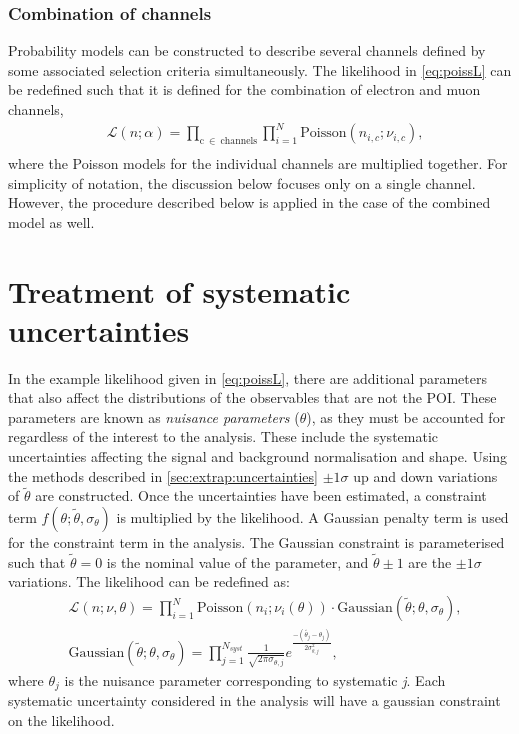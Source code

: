 \subsubsection{Combination of channels}
Probability models can be constructed to describe several channels defined by some associated selection criteria simultaneously. The likelihood in \cref{eq:poissL} can be redefined such that it is defined for the combination of electron and muon channels,
\begin{equation}
    \label{eq:poissLcomb}
    \begin{aligned}
        & \mathcal{L}(n;\alpha) = \prod_{\mathrm{c}~\in~\mathrm{channels}}\prod_{i=1}^{N}\mathrm{Poisson}(n_{i,c};\nu_{i,c}), \\
    \end{aligned}
\end{equation}
where the Poisson models for the individual channels are multiplied together. For simplicity of notation, the discussion below focuses only on a single channel. However, the procedure described below is applied in the case of the combined model as well. 

\section{Treatment of systematic uncertainties}\label{sec:stats:nps}
In the example likelihood given in \cref{eq:poissL}, there are additional parameters that also affect the distributions of the observables that are not the POI. These parameters are known as \emph{nuisance parameters} ($\theta$), as they must be accounted for regardless of the interest to the analysis. These include the systematic uncertainties affecting the signal and background normalisation and shape. Using the methods described in \cref{sec:extrap:uncertainties} $\pm 1\sigma$ up and down variations of $\tilde{\theta}$ are constructed. Once the uncertainties have been estimated, a constraint term $f(\theta;\tilde{\theta},\sigma_\theta)$ is multiplied by the likelihood. A Gaussian penalty term is used for the constraint term in the analysis. The Gaussian constraint is parameterised such that $\tilde{\theta} = 0$ is the nominal value of the parameter, and $\tilde{\theta} \pm 1$ are the $\pm1\sigma$ variations. The likelihood can be redefined as:
\begin{equation}
    \label{eq:likelihood}
    \begin{aligned}
        & \mathcal{L}(n;\nu,\theta) = \prod_{i=1}^{N}\mathrm{Poisson}(n_i;\nu_i(\theta)) \cdot \mathrm{Gaussian}(\tilde{\theta};\theta,\sigma_\theta), \\
        & \mathrm{Gaussian}(\tilde{\theta};\theta,\sigma_\theta) = \prod_{j=1}^{N_{syst}} \frac{1}{\sqrt{2\pi\sigma_{\theta,j}}} e^\frac{-(\tilde{\theta_j} - \theta_j)}{2\sigma_{\theta,j}^2},
    \end{aligned}
\end{equation}
where $\theta_j$ is the nuisance parameter corresponding to systematic \emph{j}. Each systematic uncertainty considered in the analysis will have a gaussian constraint on the likelihood. 

